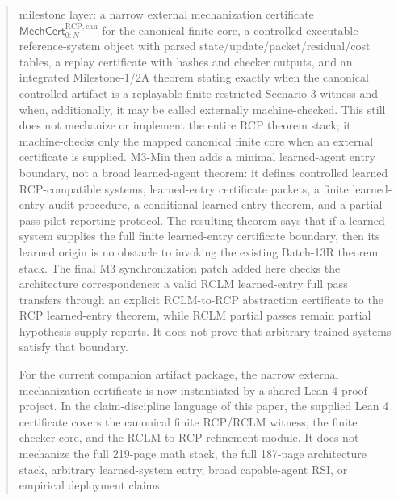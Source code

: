 \documentclass[11pt]{article}
\newcommand{\1}{\mathbf{1}}
\newcommand{\RCP}{\mathrm{RCP}}
\begin{document}
\begin{abstract}
milestone layer: a narrow external mechanization certificate \(\mathsf{MechCert}_{0:N}^{\RCP,\mathrm{can}}\) for the canonical finite core, a controlled executable reference-system object with parsed state/update/packet/residual/cost tables, a replay certificate with hashes and checker outputs, and an integrated Milestone-1/2A theorem stating exactly when the canonical controlled artifact is a replayable finite restricted-Scenario-3 witness and when, additionally, it may be called externally machine-checked. This still does not mechanize or implement the entire RCP theorem stack; it machine-checks only the mapped canonical finite core when an external certificate is supplied. M3-Min then adds a minimal learned-agent entry boundary, not a broad learned-agent theorem: it defines controlled learned RCP-compatible systems, learned-entry certificate packets, a finite learned-entry audit procedure, a conditional learned-entry theorem, and a partial-pass pilot reporting protocol. The resulting theorem says that if a learned system supplies the full finite learned-entry certificate boundary, then its learned origin is no obstacle to invoking the existing Batch-13R theorem stack. The final M3 synchronization patch added here checks the architecture correspondence: a valid RCLM learned-entry full pass transfers through an explicit RCLM-to-RCP abstraction certificate to the RCP learned-entry theorem, while RCLM partial passes remain partial hypothesis-supply reports. It does not prove that arbitrary trained systems satisfy that boundary.

For the current companion artifact package, the narrow external mechanization certificate is now instantiated by a shared Lean 4 proof project.  In the claim-discipline language of this paper, the supplied Lean 4 certificate covers the canonical finite RCP/RCLM witness, the finite checker core, and the RCLM-to-RCP refinement module.  It does not mechanize the full 219-page math stack, the full 187-page architecture stack, arbitrary learned-system entry, broad capable-agent RSI, or empirical deployment claims.

\end{abstract}
\end{document}
